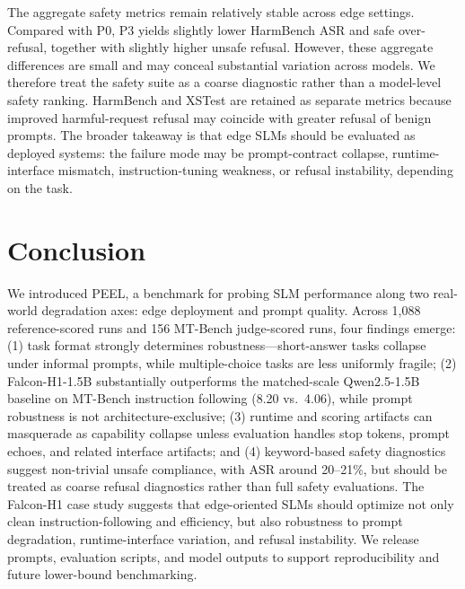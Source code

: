 \documentclass[letterpaper]{article} %
\begin{document}
The aggregate safety metrics remain relatively stable across edge settings.
Compared with P0, P3 yields slightly lower HarmBench ASR and safe over-refusal,
together with slightly higher unsafe refusal. However, these aggregate
differences are small and may conceal substantial variation across models. We
therefore treat the safety suite as a coarse diagnostic rather than a
model-level safety ranking. HarmBench and XSTest are retained as separate
metrics because improved harmful-request refusal may coincide with greater
refusal of benign prompts. The broader takeaway is that edge SLMs should be
evaluated as deployed systems: the failure mode may be prompt-contract
collapse, runtime-interface mismatch, instruction-tuning weakness, or refusal
instability, depending on the task.
\section{Conclusion}
\label{sec:conclusion}

We introduced PEEL, a benchmark for probing SLM performance along two real-world degradation axes: edge deployment and prompt quality. Across 1,088 reference-scored runs and 156 MT-Bench judge-scored runs, four findings emerge: (1) task format strongly determines robustness---short-answer tasks collapse under informal prompts, while multiple-choice tasks are less uniformly fragile; (2) Falcon-H1-1.5B substantially outperforms the matched-scale Qwen2.5-1.5B baseline on MT-Bench instruction following (8.20 vs.\ 4.06), while prompt robustness is not architecture-exclusive; (3) runtime and scoring artifacts can masquerade as capability collapse unless evaluation handles stop tokens, prompt echoes, and related interface artifacts; and (4) keyword-based safety diagnostics suggest non-trivial unsafe compliance, with ASR around 20--21\%, but should be treated as coarse refusal diagnostics rather than full safety evaluations. The Falcon-H1 case study suggests that edge-oriented SLMs should optimize not only clean instruction-following and efficiency, but also robustness to prompt degradation, runtime-interface variation, and refusal instability. We release prompts, evaluation scripts, and model outputs to support reproducibility and future lower-bound benchmarking.



\end{document}
